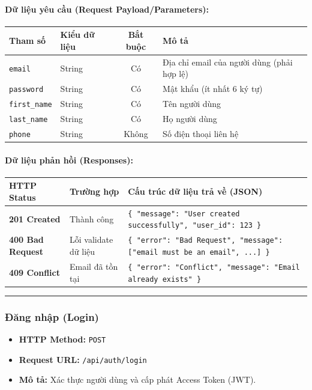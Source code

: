 \documentclass[12pt,a4paper]{article}
\begin{document}
\paragraph{Dữ liệu yêu cầu (Request Payload/Parameters):}
\begin{longtable}{|p{2.8cm}|p{2.2cm}|c|p{7.0cm}|}
\hline
\textbf{Tham số} & \textbf{Kiểu dữ liệu} & \textbf{Bắt buộc} & \textbf{Mô tả} \\ \hline
\endhead
\texttt{email} & String & Có & Địa chỉ email của người dùng (phải hợp lệ) \\ \hline
\texttt{password} & String & Có & Mật khẩu (ít nhất 6 ký tự) \\ \hline
\texttt{first\_name} & String & Có & Tên người dùng \\ \hline
\texttt{last\_name} & String & Có & Họ người dùng \\ \hline
\texttt{phone} & String & Không & Số điện thoại liên hệ \\ \hline
\end{longtable}

\paragraph{Dữ liệu phản hồi (Responses):}
\begin{longtable}{|p{2.8cm}|p{3.2cm}|p{8.0cm}|}
\hline
\textbf{HTTP Status} & \textbf{Trường hợp} & \textbf{Cấu trúc dữ liệu trả về (JSON)} \\ \hline
\endhead
\textbf{201 Created} & Thành công & \texttt{\{ "message": "User created successfully", "user\_id": 123 \}} \\ \hline
\textbf{400 Bad Request} & Lỗi validate dữ liệu & \texttt{\{ "error": "Bad Request", "message": ["email must be an email", ...] \}} \\ \hline
\textbf{409 Conflict} & Email đã tồn tại & \texttt{\{ "error": "Conflict", "message": "Email already exists" \}} \\ \hline
\end{longtable}

\vskip 0.4cm
\noindent\rule{\textwidth}{0.3pt}
\vskip 0.4cm

\subsubsection{Đăng nhập (Login)}
\begin{itemize}[leftmargin=*]
    \item \textbf{HTTP Method:} \texttt{POST}
    \item \textbf{Request URL:} \texttt{/api/auth/login}
    \item \textbf{Mô tả:} Xác thực người dùng và cấp phát Access Token (JWT).
\end{itemize}
\end{document}
